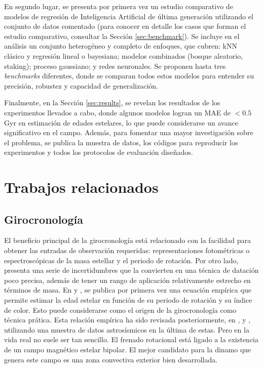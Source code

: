 En segundo lugar, se presenta por primera vez un estudio comparativo de modelos de regresión de Inteligencia Artificial de última generación utilizando el conjunto de datos comentado (para conocer en detalle los casos que forman el estudio comparativo, consultar la Sección \ref{sec:benchmark}). Se incluye en el análisis un conjunto heterogéneo y completo de enfoques, que cubren: kNN clásico y regresión lineal o bayesiana; modelos combinados (bosque aleatorio, staking); proceso gaussiano; y redes neuronales. Se proponen hasta tres \emph{benchmarks} diferentes, donde se comparan todos estos modelos para entender su precisión, robustez y capacidad de generalización.

Finalmente, en la Sección \ref{sec:results}, se revelan los resultados de los experimentos llevados a cabo, donde algunos modelos logran un MAE de $<0.5$ Gyr en estimación de edades estelares, lo que puede considerarse un avance significativo en el campo. Además, para fomentar una mayor investigación sobre el problema, se publica la muestra de datos, los códigos para reproducir los experimentos y todos los protocolos de evaluación diseñados. 

 

\chapter{Trabajos relacionados} 
\label{sec:related_work}

\section{Girocronología}
El beneficio principal de la girocronología está relacionado con la facilidad para obtener las entradas de observación requeridas: representaciones fotométricas o espectroscópicas de la masa estellar y el periodo de rotación. Por otro lado, presenta una serie de incertidumbres que la convierten en una técnica de datación poco precisa, además de tener un rango de aplicación relativamente estrecho en términos de masa. En \cite{Barnes03} y \cite{Barnes07}, se publica por primera vez una ecuación empírica que permite estimar la edad estelar en función de su periodo de rotación y su índice de color. Esto puede considerarse como el origen de la girocronología como técnica prática. Esta relación empírica ha sido revisada posteriormente, en \cite{MH}, \cite{Barnes10} y \cite{Angus15}, utilizando una muestra de datos astrosísmicos en la última de estas. Pero en la vida real no suele ser tan sencillo. El frenado rotacional está ligado a la existencia de un campo magnético estelar bipolar. El mejor candidato para la dinamo que genera este campo es una zona convectiva exterior bien desarrollada.

